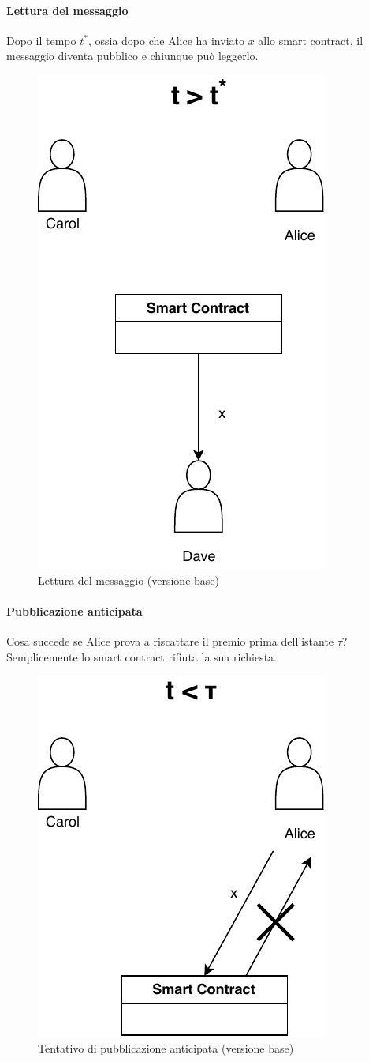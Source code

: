 \paragraph{Lettura del messaggio}
Dopo il tempo $ t^{*} $, ossia dopo che Alice ha inviato $ x $ allo smart contract,
il messaggio diventa pubblico e
chiunque può leggerlo.
\begin{figure}[H]
	\centering
	\includegraphics[width=0.27\linewidth]{images/chap_protocollo/base-leggi.pdf}
	\caption{Lettura del messaggio (versione base)}
\end{figure}

\paragraph{Pubblicazione anticipata}
Cosa succede se Alice prova a riscattare il premio prima dell'istante $ \tau $?
Semplicemente lo smart contract rifiuta la sua richiesta.
\begin{figure}[H]
	\centering
	\includegraphics[width=0.3\linewidth]{images/chap_protocollo/base-anticipo.pdf}
	\caption{Tentativo di pubblicazione anticipata (versione base)}
\end{figure}

